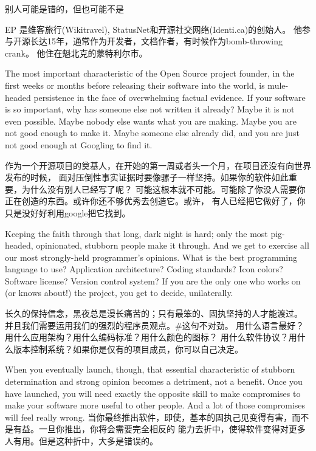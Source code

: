 {别人可能是错的，但也可能不是}

{
EP 是维客旅行(Wikitravel), StatusNet和开源社交网络(Identi.ca)的创始人。
他参与开源长达15年，通常作为开发者，文档作者，有时候作为bomb-throwing crank。
他住在魁北克的蒙特利尔市。
}

\noindent{}The most important characteristic of the Open Source project founder, in the
first weeks or months before releasing their software into the world, is
mule-headed persistence in the face of overwhelming factual evidence. If your
software is so important, why has someone else not written it already? Maybe it is not even possible. Maybe nobody else wants what you are making. Maybe you are not good enough to make it. Maybe someone else already did, and you are just not good enough at Googling to find it.

作为一个开源项目的奠基人，在开始的第一周或者头一个月，在项目还没有向世界发布的时候，
面对压倒性事实证据时要像骡子一样坚持。如果你的软件如此重要，为什么没有别人已经写了呢？
可能这根本就不可能。可能除了你没人需要你正在创造的东西。或许你还不够优秀去创造它。或许，
有人已经把它做好了，你只是没好好利用google把它找到。

Keeping the faith through that long, dark night is hard; only the most
pig-headed, opinionated, stubborn people make it through. And we get to exercise
all our most strongly-held programmer's opinions. What is the best programming
language to use? Application architecture? Coding standards? Icon colors?
Software license? Version control system? If you are the only one who works on
(or knows about!) the project, you get to decide, unilaterally.

长久的保持信念，黑夜总是漫长痛苦的；只有最笨的、固执坚持的人才能渡过。
并且我们需要运用我们的强烈的程序员观点。#这句不对劲。
用什么语言最好？用什么应用架构？用什么编码标准？用什么颜色的图标？
用什么软件协议？用什么版本控制系统？如果你是仅有的项目成员，你可以自己决定。

When you eventually launch, though, that essential characteristic of stubborn
determination and strong opinion becomes a detriment, not a benefit. Once you have launched, you will need exactly the opposite skill to make compromises to make your software more useful to other people. And a lot of those compromises will feel really wrong.
当你最终推出软件，即使，基本的固执己见变得有害，而不是有益。一旦你推出，你将会需要完全相反的
能力去折中，使得软件变得对更多人有用。但是这种折中，大多是错误的。

